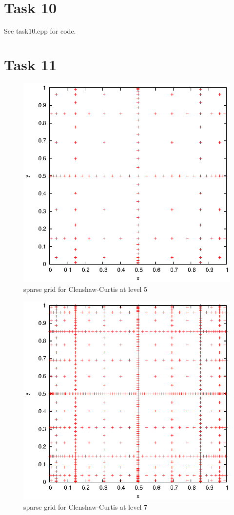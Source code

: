 \documentclass[]{article}
\begin{document}
\section*{Task 10}
See task10.cpp for code.

\section*{Task 11}
\begin{figure}[!ht]
\includegraphics[width=.9\textwidth]{task11_cc5}
\caption{sparse grid for Clenshaw-Curtis at level 5}
\label{fig:Task11a}
\end{figure}

\begin{figure}[!ht]
\includegraphics[width=.9\textwidth]{task11_cc7}
\caption{sparse grid for Clenshaw-Curtis at level 7}
\label{fig:Task11b}
\end{figure}
\end{document}
